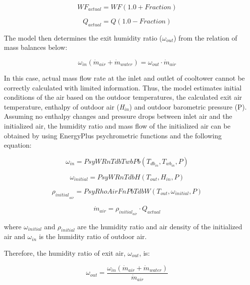 \begin{equation}
W{F_{actual}} = WF(1.0 + Fraction)
\end{equation}

\begin{equation}
{Q_{actual}} = Q(1.0 - Fraction)
\end{equation}

The model then determines the exit humidity ratio (\({\omega_{out}}\)) from the relation of mass balances below:

\begin{equation}
{\omega_{in}}({\dot m_{air}} + {\dot m_{water}}) = {\omega_{out}} \cdot {\dot m_{air}}
\end{equation}

In this case, actual mass flow rate at the inlet and outlet of cooltower cannot be correctly calculated with limited information. Thus, the model estimates initial conditions of the air based on the outdoor temperatures, the calculated exit air temperature, enthalpy of outdoor air (\emph{H\(_{in}\)}) and outdoor barometric pressure (P). Assuming no enthalpy changes and pressure drops between inlet air and the initialized air, the humidity ratio and mass flow of the initialized air can be obtained by using EnergyPlus psychrometric functions and the following equation:

\begin{equation}
{\omega_{in}} = PsyWRnTdbTwbPb({T_{d{b_{in}}}},{T_{w{b_{in}}}},P)
\end{equation}

\begin{equation}
{\omega_{initial}} = PsyWRnTdbH({T_{out}},{H_{in}},P)
\end{equation}

\begin{equation}
{\rho_{initial}}_{_{air}} = PsyRhoAirFnPbTdbW({T_{out}},{\omega_{initial}},P)
\end{equation}

\begin{equation}
{\dot m_{air}} = {\rho_{initia{l_{air}}}} \cdot {Q_{actual}}
\end{equation}

where \({\omega_{initial}}\) and \({\rho_{initial}}\) are the humidity ratio and air density of the initialized air and \({\omega_{in}}\) is the humidity ratio of outdoor air.

Therefore, the humidity ratio of exit air, \({\omega_{out}}\), is:

\begin{equation}
{\omega_{out}} = \frac{{{\omega_{in}}({{\dot m}_{air}} + {{\dot m}_{water}})}}{{{{\dot m}_{air}}}}
\end{equation}

